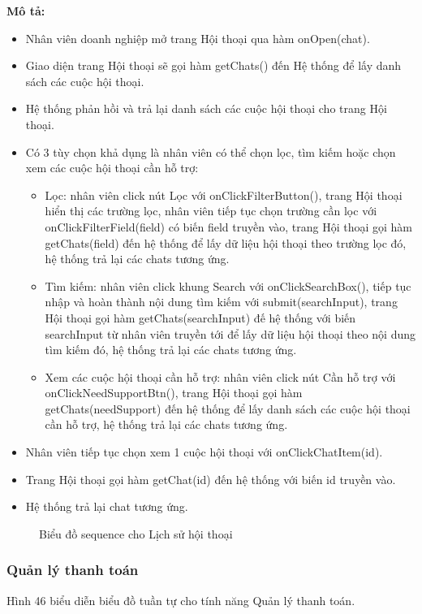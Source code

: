 \textbf{Mô tả: }
\begin{itemize}
	\item Nhân viên doanh nghiệp mở trang Hội thoại qua hàm onOpen(chat).
	\item Giao diện trang Hội thoại sẽ gọi hàm getChats() đến Hệ thống để lấy danh sách các cuộc hội thoại.
	\item Hệ thống phản hồi và trả lại danh sách các cuộc hội thoại cho trang Hội thoại.
	\item Có 3 tùy chọn khả dụng là nhân viên có thể chọn lọc, tìm kiếm hoặc chọn xem các cuộc hội thoại cần hỗ trợ:
	\begin{itemize}
		\item Lọc: nhân viên click nút Lọc với onClickFilterButton(), trang Hội thoại hiển thị các trường lọc, nhân viên tiếp tục chọn trường cần lọc với onClickFilterField(field) có biến field truyền vào, trang Hội thoại gọi hàm getChats(field) đến hệ thống để lấy dữ liệu hội thoại theo trường lọc đó, hệ thống trả lại các chats tương ứng.
		\item Tìm kiếm: nhân viên click khung Search với onClickSearchBox(), tiếp tục nhập và hoàn thành nội dung tìm kiếm với submit(searchInput), trang Hội thoại gọi hàm getChats(searchInput) đế hệ thống với biến searchInput từ nhân viên truyền tới để lấy dữ liệu hội thoại theo nội dung tìm kiếm đó, hệ thống trả lại các chats tương ứng.
		\item Xem các cuộc hội thoại cần hỗ trợ: nhân viên click nút Cần hỗ trợ với onClickNeedSupportBtn(), trang Hội thoại gọi hàm getChats(needSupport) đến hệ thống để lấy danh sách các cuộc hội thoại cần hỗ trợ, hệ thống trả lại các chats tương ứng.
	\end{itemize}
	\item Nhân viên tiếp tục chọn xem 1 cuộc hội thoại với onClickChatItem(id).
	\item Trang Hội thoại gọi hàm getChat(id) đến hệ thống với biến id truyền vào.
	\item Hệ thống trả lại chat tương ứng.
\end{itemize}

\begin{figure}[H]
    \centering
     
    \vspace{0.5cm}
    \caption{Biểu đồ sequence cho Lịch sử hội thoại}
    \label{fig:enter-label}
\end{figure}

\subsubsection{Quản lý thanh toán}
Hình 46 biểu diễn biểu đồ tuần tự cho tính năng Quản lý thanh toán.

